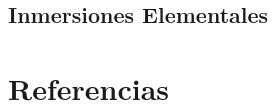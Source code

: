 \section{Inmersiones Elementales}
\label{sec:elem-embed}
\fi
\backmatter
\ifreferencias
\chapter*{Referencias}
\printbibliography[heading=mybib]
\fi

